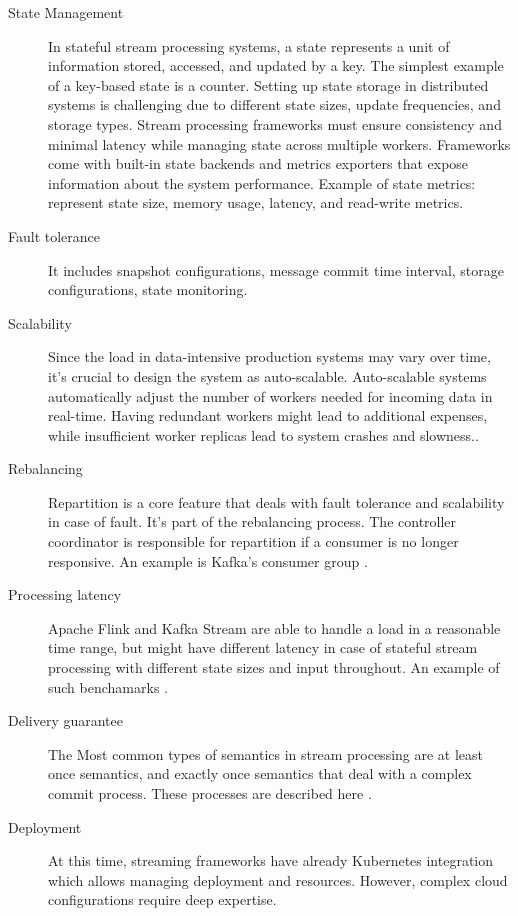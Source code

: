 \begin{description}
    \item[State Management] In stateful stream processing systems, a state represents a unit of information stored, accessed, and updated by a key. The simplest example of a key-based state is a counter. Setting up state storage in distributed systems is challenging due to different state sizes, update frequencies, and storage types. Stream processing frameworks must ensure consistency and minimal latency while managing state across multiple workers. Frameworks come with built-in state backends and metrics exporters that expose information about the system performance.
    Example of state metrics: represent state size, memory usage, latency, and read-write metrics.
    \item[Fault tolerance] It includes snapshot configurations, message commit time interval, storage configurations,
    state monitoring.
    \item[Scalability] Since the load in data-intensive production systems may vary over time,
    it's crucial to design the system as auto-scalable.
    Auto-scalable systems automatically adjust the number of workers needed for incoming data in real-time.
    Having redundant workers might lead to additional expenses, while insufficient
    worker replicas lead to system crashes and slowness..
    \item[Rebalancing] Repartition is a core feature that deals with fault tolerance
    and scalability in case of fault.
    It's part of the rebalancing process.
    The controller coordinator is responsible for repartition if a consumer is no longer responsive.
    An example is Kafka's consumer group \cite{kafka2020}.
    \item [Processing latency] Apache Flink and Kafka Stream are able
    to handle a load in a reasonable time range, but might have different latency in case of stateful stream processing
    with different state sizes and input throughout.
    An example of such benchamarks \cite{Henning_2024}.
    \item[Delivery guarantee] The Most common types of semantics in stream processing are at least once semantics, and
    exactly once semantics that deal with a complex commit process.
    These processes are described here \cite{confluentExactlyOnce, flinkExactlyOnce2018}.
    \item[Deployment] At this time, streaming frameworks have already Kubernetes
    integration which allows managing deployment and resources.
    However, complex cloud configurations require deep expertise.
\end{description}


